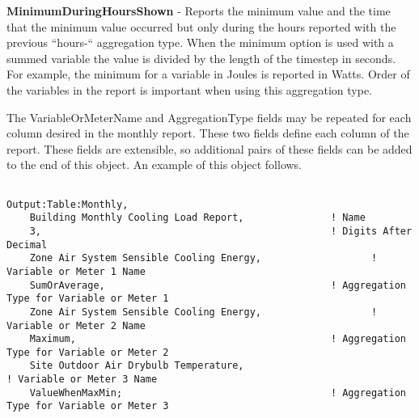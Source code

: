 \textbf{MinimumDuringHoursShown} - Reports the minimum value and the time that the minimum value occurred but only during the hours reported with the previous ``hours-`` aggregation type. When the minimum option is used with a summed variable the value is divided by the length of the timestep in seconds. For example, the minimum for a variable in Joules is reported in Watts. Order of the variables in the report is important when using this aggregation type.

The VariableOrMeterName and AggregationType fields may be repeated for each column desired in the monthly report. These two fields define each column of the report.  These fields are extensible, so additional pairs of these fields can be added to the end of this object.  An example of this object follows.

\begin{lstlisting}

Output:Table:Monthly,
    Building Monthly Cooling Load Report,               ! Name
    3,                                                  ! Digits After Decimal
    Zone Air System Sensible Cooling Energy,                   ! Variable or Meter 1 Name
    SumOrAverage,                                       ! Aggregation Type for Variable or Meter 1
    Zone Air System Sensible Cooling Energy,                   ! Variable or Meter 2 Name
    Maximum,                                            ! Aggregation Type for Variable or Meter 2
    Site Outdoor Air Drybulb Temperature,                                   ! Variable or Meter 3 Name
    ValueWhenMaxMin;                                    ! Aggregation Type for Variable or Meter 3
\end{lstlisting}